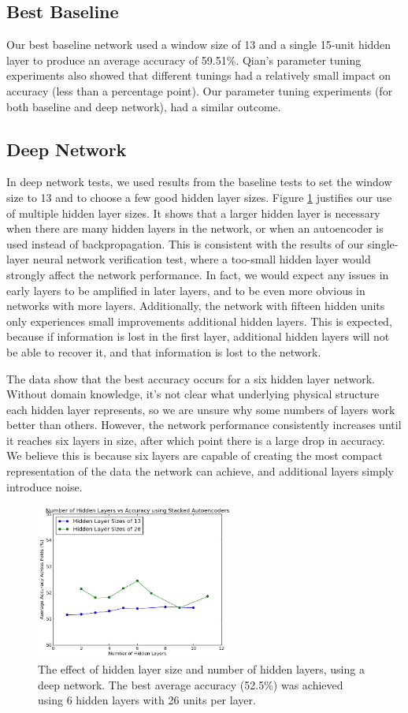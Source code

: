 \documentclass[letterpaper,twocolumn,12pt]{article}
\begin{document}
\subsection{Best Baseline}
Our best baseline network used a window size of 13 and a single 15-unit hidden layer to produce an average accuracy of 59.51\%.
Qian's parameter tuning experiments also showed that different tunings had a relatively small impact on accuracy (less than a percentage point).
Our parameter tuning experiments (for both baseline and deep network), had a similar outcome.

\subsection{Deep Network}
In deep network tests, we used results from the baseline tests to set the window size to 13 and to choose a few good hidden layer sizes.
Figure \ref{fig:deep_num_hidden_layers} justifies our use of multiple hidden layer sizes.
It shows that a larger hidden layer is necessary when there are many hidden layers in the network, or when an autoencoder is used instead of backpropagation.
This is consistent with the results of our single-layer neural network verification test, where a too-small hidden layer would strongly affect the network performance.
In fact, we would expect any issues in early layers to be amplified in later layers, and to be even more obvious in networks with more layers.
Additionally, the network with fifteen hidden units only experiences small improvements additional hidden layers.
This is expected, because if information is lost in the first layer, additional hidden layers will not be able to recover it, and that information is lost to the network.

The data show that the best accuracy occurs for a six hidden layer network.
Without domain knowledge, it's not clear what underlying physical structure each hidden layer represents, so we are unsure why some numbers of layers work better than others.
However, the network performance consistently increases until it reaches six layers in size, after which point there is a large drop in accuracy.
We believe this is because six layers are capable of creating the most compact representation of the data the network can achieve, and additional layers simply introduce noise.

\begin{figure}[ht!]
\centering
\includegraphics[width=65mm]{results/deep/numLayers/deep_numLayers.png}
\caption{The effect of hidden layer size and number of hidden layers, using a deep network. The best average accuracy (52.5\%) was achieved using 6 hidden layers with 26 units per layer.}
\label{fig:deep_num_hidden_layers}
\end{figure}
\end{document}
